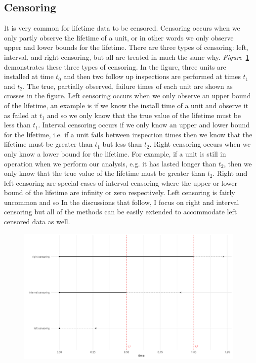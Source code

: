 \subsection{Censoring}

It is very common for lifetime data to be censored. Censoring occurs when we only partly observe the lifetime of a unit, or in other words we only observe upper and lower bounds for the lifetime. There are three types of censoring: left, interval, and right censoring, but all are treated in much the same why. \textit{Figure}~\ref{fig:cense_examp} demonstrates these three types of censoring. In the figure, three units are installed at time $t_0$ and then two follow up inspections are performed at times $t_1$ and $t_2$. The true, partially observed, failure times of each unit are shown as crosses in the figure. Left censoring occurs when we only observe an upper bound of the lifetime, an example is if we know the install time of a unit and observe it as failed at $t_1$ and so we only know that the true value of the lifetime must be less than $t_1$. Interval censoring occurs if we only know an upper and lower bound for the lifetime, i.e. if a unit fails between inspection times then we know that the lifetime must be greater than $t_1$ but less than $t_2$. Right censoring occurs when we only know a lower bound for the lifetime. For example, if a unit is still in operation when we perform our analysis, e.g. it has lasted longer than $t_2$, then we only know that the true value of the lifetime must be greater than $t_2$. Right and left censoring are special cases of interval censoring where the upper or lower bound of the lifetime are infinity or zero respectively. Left censoring is fairly uncommon and so In the discussions that follow, I focus on right and interval censoring but all of the methods can be easily extended to accommodate left censored data as well.

\begin{figure}[h]
    \centering
    \includegraphics[width=1\textwidth]{./figures/censoring_example.pdf}
    \caption{}
    \label{fig:cense_examp}
\end{figure}


